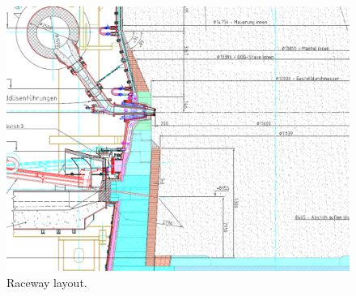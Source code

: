 \begin{figure}[!htb]
\centering
\includegraphics[width=.80\columnwidth]{images/068racewaylayout}
\caption[Raceway layout]{Raceway layout.}
\label{fig:068racewaylayout}
\end{figure}